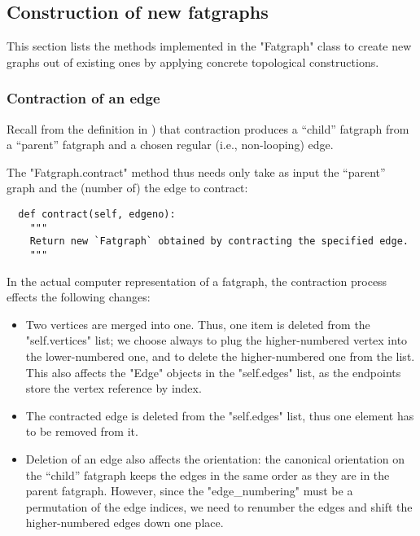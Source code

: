 \subsection{Construction of new fatgraphs}
\label{sec:construction}

This section lists the methods implemented in the "Fatgraph" class to
create new graphs out of existing ones by applying concrete
topological constructions.

\subsubsection{Contraction of an edge}
\label{sec:contract}


Recall from the definition in ) that
contraction produces a ``child'' fatgraph from a ``parent'' fatgraph
and a chosen regular (i.e., non-looping) edge. 

The "Fatgraph.contract" method thus needs only take as input the ``parent''
graph and the (number of) the edge to contract:
\begin{lstlisting}
  def contract(self, edgeno):
    """
    Return new `Fatgraph` obtained by contracting the specified edge.
    """

\end{lstlisting}

In the actual computer representation of a fatgraph, the contraction
process effects the following changes:
\begin{itemize}
\item Two vertices are merged into one. Thus, one item is deleted from
  the "self.vertices" list; we choose always to plug the
  higher-numbered vertex into the lower-numbered one, and to delete
  the higher-numbered one from the list.  This also affects the "Edge"
  objects in the "self.edges" list, as the endpoints store the vertex
  reference by index.
\item The contracted edge is deleted from the "self.edges" list, thus
  one element has to be removed from it.
\item Deletion of an edge also affects the orientation: the canonical
  orientation on the ``child'' fatgraph keeps the edges in the same
  order as they are in the parent fatgraph.  However, since the
  "edge_numbering" must be a permutation of the edge indices, we need
  to renumber the edges and shift the higher-numbered edges down one
  place. 
\end{itemize}

